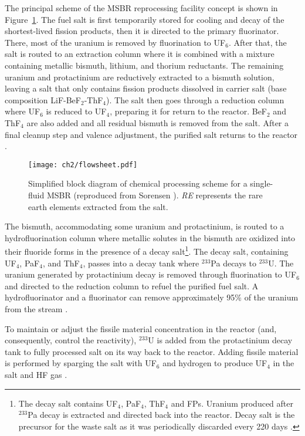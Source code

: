 The principal scheme of the \gls{MSBR} reprocessing facility concept is shown 
in Figure~\ref{fig:material_flow}. The fuel salt is first temporarily stored 
for cooling and decay of the shortest-lived fission products, then it is 
directed to the primary fluorinator. There, most of the uranium is removed by 
fluorination to UF$_6$. After that, the salt is routed to an extraction column 
where it is combined with a mixture containing metallic bismuth, lithium, and 
thorium reductants. The remaining uranium and protactinium are reductively 
extracted to a bismuth solution, leaving a salt that only contains fission 
products dissolved in carrier salt (base composition LiF-BeF$_2$-ThF$_4$). The 
salt then goes through a reduction column where UF$_6$ is reduced to UF$_4$,  
preparing it for return to the reactor. BeF$_2$ and ThF$_4$ are also added and 
all residual bismuth is removed from the salt. After a final cleanup step and  
valence adjustment, the purified salt returns to the reactor 
\cite{carter_design_1972, sorensen_one-fluid_2006}.
\begin{figure}[htp!] %
	\centering
	\texttt{[image: ch2/flowsheet.pdf]}
	\caption{Simplified block diagram of chemical processing scheme for 
	a single-fluid \gls{MSBR} (reproduced from Sorensen 
		\cite{sorensen_one-fluid_2006}). \emph{RE} represents the rare 
		earth elements extracted from the salt.}
	\label{fig:material_flow}
\end{figure}

The bismuth, accommodating some uranium and protactinium, is routed to a 
hydrofluorination column where metallic solutes in the bismuth are oxidized 
into their fluoride forms in the presence of a decay salt\footnote{The decay 
salt contains UF$_4$, PaF$_4$, ThF$_4$ and \glspl{FP}. Uranium produced 
after $^{233}$Pa decay is extracted and directed back into the reactor. Decay 
salt is the precursor for the waste salt as it was periodically discarded  
every 220 days \cite{robertson_conceptual_1971}.}. The decay salt, containing 
UF$_4$, PaF$_4$, and ThF$_4$, passes into a decay tank where $^{233}$Pa 
decays to $^{233}$U. The uranium generated by protactinium decay is removed 
through fluorination to UF$_6$ and directed to the reduction column to refuel 
the purified fuel salt. A  hydrofluorinator and a fluorinator can remove 
approximately 95\% of the uranium from the stream 
\cite{robertson_conceptual_1971}.

To maintain or adjust the fissile material concentration in the reactor 
(and, consequently, control the reactivity), $^{233}$U is added from the 
protactinium decay tank to fully processed salt on its way back to the 
reactor. Adding fissile material is performed by sparging the salt with UF$_6$ 
and hydrogen to produce UF$_4$ in the salt and HF gas 
\cite{robertson_conceptual_1971}.

